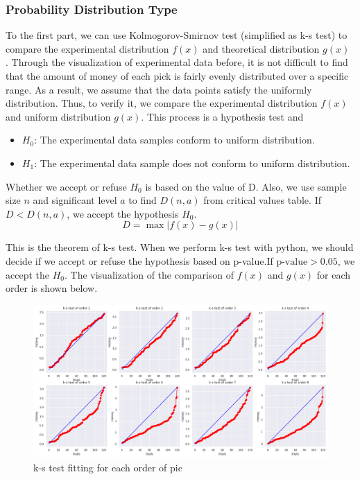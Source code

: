 \documentclass{scrartcl}
\begin{document}
\subsubsection{Probability Distribution Type}
To the first part, we can use Kolmogorov-Smirnov test (simplified as k-s test) to compare the experimental distribution $f(x)$ and theoretical distribution $g(x)$ \cite{bergerKolmogorovSmirnovTest2014}. Through the visualization of experimental data before, it is not difficult to find that the amount of money of each pick is fairly evenly distributed over a specific range.  As a result, we assume that the data points satisfy the uniformly distribution. Thus, to verify it, we compare the experimental distribution $f(x)$ and uniform distribution $g(x)$. This process is a hypothesis test and
\begin{itemize}
\item $H_0$: The experimental data samples conform to uniform distribution.
\item $H_1$: The experimental data sample does not conform to uniform distribution.
\end{itemize}\par
Whether we accept or refuse $H_0$ is based on the value of D. Also, we use sample size $n$ and significant level $a$ to find $D(n,a)$ from critical values table. If $D < D(n,a)$, we accept the hypothesis $H_0$. 
$$D=\max|f(x)-g(x)| $$\par
This is the theorem of k-s test. When we perform k-s test with python, we should decide if we accept or refuse the hypothesis based on p-value.If $\text{p-value} > 0.05$, we accept the $H_0$. The visualization of the comparison of $f(x)$ and $g(x)$ for each order is shown below.
\begin{figure}[H]
	\begin{center}
		\includegraphics[width=15cm]{下载.png}
	\end{center}
	\caption{k-s test fitting for each order of pic}
	\label{code}
\end{figure}
\end{document}
